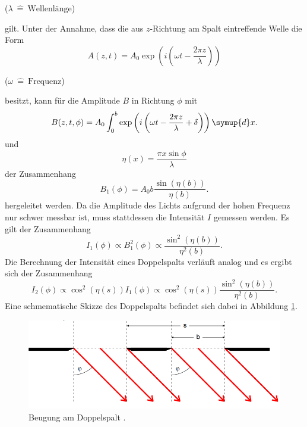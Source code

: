 \begin{center}
 \small {($\lambda \: \hat{=} \:\text{Wellenlänge}$)}
\end{center}
gilt.
Unter der Annahme, dass die aus $z$-Richtung am Spalt eintreffende Welle die Form
\begin{equation}
  A(z,t) = A_0\exp \left(i\left(\omega t-\frac{2\pi z}{\lambda}\right)\right)
\end{equation}
\begin{center}
 \small {($\omega \: \hat{=} \:\text{Frequenz}$)}
\end{center}
besitzt, kann für die Amplitude $B$ in Richtung $\phi$ mit
\begin{equation}
    B(z,t,\phi) = A_0 \int_0^b\exp\left(i\left(\omega t-\frac{2\pi z}{\lambda}+\delta\right)\right)\symup{d}x\text{.}
\end{equation}
 und
 \begin{equation}
   \eta(x) = \frac{\pi x \sin \phi}{\lambda}
 \end{equation}
der Zusammenhang
\begin{equation}
  B_1(\phi) = A_0b\frac{\sin{\!\left(\eta(b)\right)}}{\eta(b)}\text{.}
\end{equation}
hergeleitet werden.
Da die Amplitude des Lichts aufgrund der hohen Frequenz nur schwer messbar ist, muss stattdessen die Intensität $I$ gemessen werden.
Es gilt der Zusammenhang
\begin{equation}
I_1(\phi)\propto B^2_1(\phi) \propto \frac{\sin^2{\!\left(\eta(b)\right)}}{\eta^2(b)}\text{.} \label{eq:I1}
\end{equation}
Die Berechnung der Intensität eines Doppelspalts verläuft analog und es ergibt sich der Zusammenhang
\begin{equation}
I_2(\phi) \propto \cos^2{\!\left(\eta(s)\right)} I_1(\phi) \propto \cos^2{\!\left(\eta(s)\right)}\frac{\sin^2{\!\left(\eta(b)\right)}}{\eta^2(b)}\text{.}\label{eq:I2}
\end{equation}
Eine schmematische Skizze des Doppelspalts befindet sich dabei in Abbildung \ref{fig:phase2}.
\begin{figure}[H]
  \centering
  \includegraphics[width=\linewidth-30pt,height=\textheight-30pt,keepaspectratio]{Text/Bilder/Phasenbeziehung2.PNG}
  \caption{Beugung am Doppelspalt \cite[34]{sample}.}
  \label{fig:phase2}
\end{figure}
